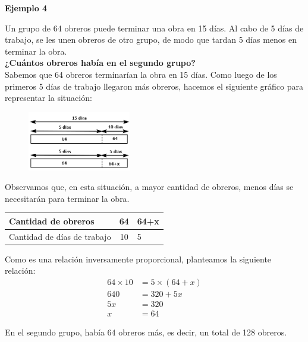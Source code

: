 {\color{brown}\textbf{Ejemplo 4}}

Un grupo de 64 obreros puede terminar una obra en 15 días. Al cabo de 5 días de trabajo, se les unen obreros de otro grupo, de modo que tardan 5 días menos en terminar la obra.\\
\textbf{¿Cuántos obreros había en el segundo grupo?}\\

Sabemos que 64 obreros terminarían la obra en 15 días. Como luego de los primeros 5 días de trabajo llegaron más obreros, hacemos el siguiente gráfico para representar la situación:
\begin{figure}[H]
    \centering
    \includegraphics[width=0.4\textwidth]{./Unidad 2/Images/tableS8L103.png}
\end{figure}
Observamos que, en esta situación, a mayor cantidad de obreros, menos días se necesitarán para terminar la obra.\\

\begin{table}[H]
    \centering
    \begin{tabular}{|l|c|l|}
        \hline
        Cantidad de obreros         & 64 & 64+x \\
        \hline
        Cantidad de días de trabajo & 10 & 5    \\
        \hline
    \end{tabular}
\end{table}

Como es una relación inversamente proporcional, planteamos la siguiente relación:
\begin{align*}
    64 \times 10 & = 5 \times (64+x) \\
    640          & = 320 +5x         \\
    5x           & = 320             \\
    x            & = 64
\end{align*}

En el segundo grupo, había 64 obreros más, es decir, un total de 128 obreros.\\